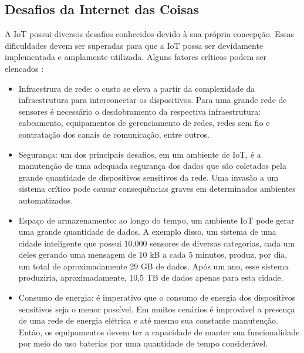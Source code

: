 
\subsection{Desafios da Internet das Coisas}
\label{subsec:desafios}
	\quad A \acrlong{IoT} possui diversos desafios conhecidos devido à sua própria concepção. Essas dificuldades devem ser superadas para que a
	\acrshort{IoT} possa ser devidamente implementada e amplamente utilizada. Alguns fatores críticos podem ser elencados \cite{roadmap}:
  \begin{itemize}
		\item Infraestrura de rede: o custo se eleva a partir da complexidade da infraestrutura para interconectar os dispositivos. Para uma grande rede de sensores é necessário o desdobramento da respectiva infraestrutura:
		 cabeamento, equipamentos de gerenciamento de redes, redes sem fio e contratação dos canais de comunicação, entre outros.

		\item Segurança: um dos principais desafios, em um ambiente de \acrlong{IoT}, é a manutenção de uma adequada segurança dos dados que são coletados pela grande quantidade de
		dispositivos sensitivos da rede. Uma invasão a um sistema crítico pode causar consequências graves em determinados ambientes automatizados.

	  \item Espaço de armazenamento: ao longo do tempo, um ambiente \acrshort{IoT} pode gerar uma grande quantidade de dados. A exemplo disso, um sistema de uma cidade inteligente que possui 10.000 sensores
 	  de diversas categorias, cada um deles gerando uma mensagem de 10 kB a cada 5 minutos, produz, por dia, um total de aproximadamente 29 GB de dados.
	  Após um ano, esse sistema produziria, aproximadamente, 10,5 TB de dados apenas para esta cidade.

		\item Consumo de energia: é imperativo que o consumo de energia dos dispositivos sensitivos seja o menor possível. Em muitos cenários é improvável a presença de uma
		rede de energia elétrica e até mesmo sua constante manutenção. Então, os equipamentos devem ter a capacidade de manter sua funcionalidade por meio do uso baterias por
		uma quantidade de tempo considerável.
\end{itemize}

